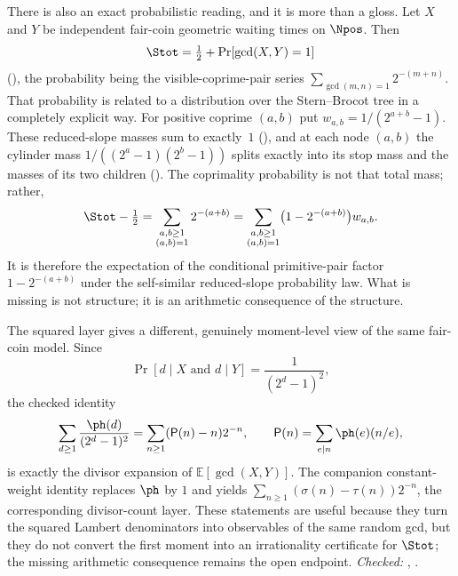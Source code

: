 There is also an exact probabilistic reading, and it is more than a gloss.
Let $X$ and $Y$ be independent fair-coin geometric waiting times on $\Npos$.
Then
\[
  \Stot=\tfrac12+\Pr[\gcd(X,Y)=1]
\]
(),
the probability being the visible-coprime-pair series
$\sum_{\gcd(m,n)=1}2^{-(m+n)}$.  That probability is related to a distribution
over the Stern--Brocot tree in a completely explicit way.  For positive
coprime $(a,b)$ put $w_{a,b}=1/(2^{a+b}-1)$.  These reduced-slope masses sum to
exactly~$1$
(),
and at each node $(a,b)$ the cylinder mass $1/((2^a-1)(2^b-1))$ splits exactly
into its stop mass and the masses of its two children
().
The coprimality probability is not that total mass; rather,
\[
  \Stot-\tfrac12
  =\sum_{\substack{a,b\ge1\\(a,b)=1}}2^{-(a+b)}
  =\sum_{\substack{a,b\ge1\\(a,b)=1}}
     \bigl(1-2^{-(a+b)}\bigr)w_{a,b}.
\]
It is therefore the expectation of the conditional primitive-pair factor
$1-2^{-(a+b)}$ under the self-similar reduced-slope probability law.  What is
missing is not structure; it is an arithmetic consequence of the structure.

The squared layer gives a different, genuinely moment-level view of the same
fair-coin model.  Since
\[
  \Pr[d\mid X\text{ and }d\mid Y]=\frac{1}{(2^d-1)^2},
\]
the checked identity
\[
  \sum_{d\ge1}\frac{\ph(d)}{(2^d-1)^2}
    =\sum_{n\ge1}(\mathsf P(n)-n)2^{-n},
  \qquad \mathsf P(n)=\sum_{e\mid n}\ph(e)(n/e),
\]
is exactly the divisor expansion of $\mathbb E[\gcd(X,Y)]$.  The companion
constant-weight identity replaces $\ph$ by $1$ and yields
$\sum_{n\ge1}(\sigma(n)-\tau(n))2^{-n}$, the corresponding divisor-count
layer.  These statements are useful because they turn the squared Lambert
denominators into observables of the same random gcd, but they do not convert
the first moment into an irrationality certificate for $\Stot$; the missing
arithmetic consequence remains the open endpoint.
{\footnotesize\emph{Checked:}
,
.}



